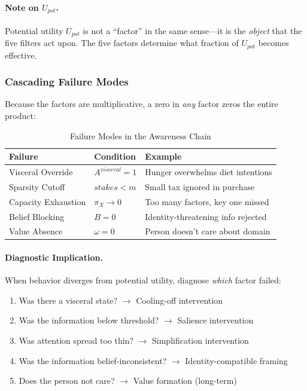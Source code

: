 \paragraph{Note on $U_{pot}$.}
Potential utility $U_{pot}$ is not a ``factor'' in the same sense—it is the 
\emph{object} that the five filters act upon. The five factors determine 
what fraction of $U_{pot}$ becomes effective.

\subsubsection{Cascading Failure Modes}
\label{subsubsec:failure-modes}

Because the factors are multiplicative, a zero in \emph{any} factor zeros 
the entire product:

\begin{table}[htbp]
\centering
\caption{Failure Modes in the Awareness Chain}
\label{tab:failure-modes}
\renewcommand{\arraystretch}{1.4}
\begin{tabular}{@{}lll@{}}
\toprule
\textbf{Failure} & \textbf{Condition} & \textbf{Example} \\
\midrule
Visceral Override & $A^{visceral} = 1$ & Hunger overwhelms diet intentions \\
Sparsity Cutoff & $stakes < m$ & Small tax ignored in purchase \\
Capacity Exhaustion & $\pi_X \to 0$ & Too many factors, key one missed \\
Belief Blocking & $B = 0$ & Identity-threatening info rejected \\
Value Absence & $\omega = 0$ & Person doesn't care about domain \\
\bottomrule
\end{tabular}
\end{table}

\paragraph{Diagnostic Implication.}
When behavior diverges from potential utility, diagnose \emph{which} 
factor failed:

\begin{enumerate}
\item Was there a visceral state? $\to$ Cooling-off intervention
\item Was the information below threshold? $\to$ Salience intervention
\item Was attention spread too thin? $\to$ Simplification intervention
\item Was the information belief-inconsistent? $\to$ Identity-compatible framing
\item Does the person not care? $\to$ Value formation (long-term)
\end{enumerate}

